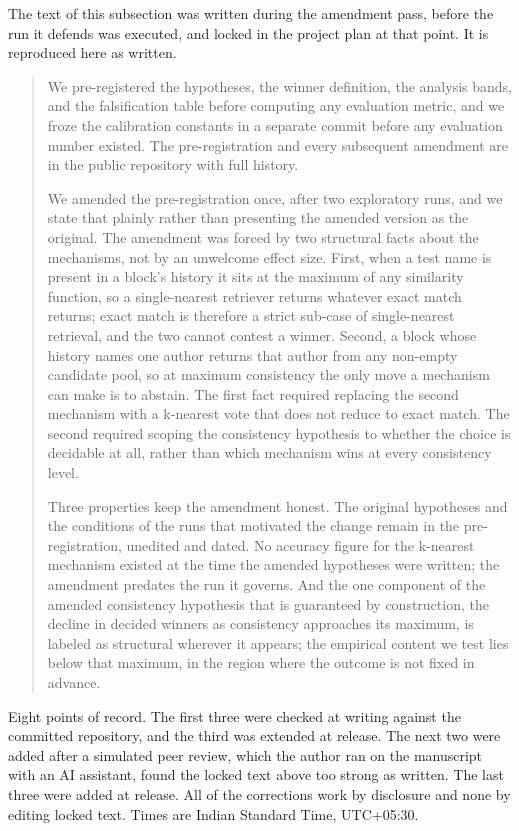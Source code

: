 \documentclass[11pt]{article}
\begin{document}
The text of this subsection was written during the amendment pass, before the
run it defends was executed, and locked in the project plan at that point. It
is reproduced here as written.

\begin{quote}
We pre-registered the hypotheses, the winner definition, the analysis bands,
and the falsification table before computing any evaluation metric, and we
froze the calibration constants in a separate commit before any evaluation
number existed. The pre-registration and every subsequent amendment are in
the public repository with full history.

We amended the pre-registration once, after two exploratory runs, and we
state that plainly rather than presenting the amended version as the
original. The amendment was forced by two structural facts about the
mechanisms, not by an unwelcome effect size. First, when a test name is
present in a block's history it sits at the maximum of any similarity
function, so a single-nearest retriever returns whatever exact match returns;
exact match is therefore a strict sub-case of single-nearest retrieval, and
the two cannot contest a winner. Second, a block whose history names one
author returns that author from any non-empty candidate pool, so at maximum
consistency the only move a mechanism can make is to abstain. The first fact
required replacing the second mechanism with a k-nearest vote that does not
reduce to exact match. The second required scoping the consistency hypothesis
to whether the choice is decidable at all, rather than which mechanism wins
at every consistency level.

Three properties keep the amendment honest. The original hypotheses and the
conditions of the runs that motivated the change remain in the
pre-registration, unedited and dated. No accuracy figure for the k-nearest
mechanism existed at the time the amended hypotheses were written; the
amendment predates the run it governs. And the one component of the amended
consistency hypothesis that is guaranteed by construction, the decline in
decided winners as consistency approaches its maximum, is labeled as
structural wherever it appears; the empirical content we test lies below that
maximum, in the region where the outcome is not fixed in advance.
\end{quote}

Eight points of record. The first three were checked at writing against the committed repository, and the third was extended at release. The next two were added after a simulated peer review,
which the author ran on the manuscript with an AI assistant, found the locked
text above too strong as written. The last three were added at release. All
of the corrections work by disclosure and none by editing locked text. Times
are Indian Standard Time, UTC+05:30.
\end{document}
